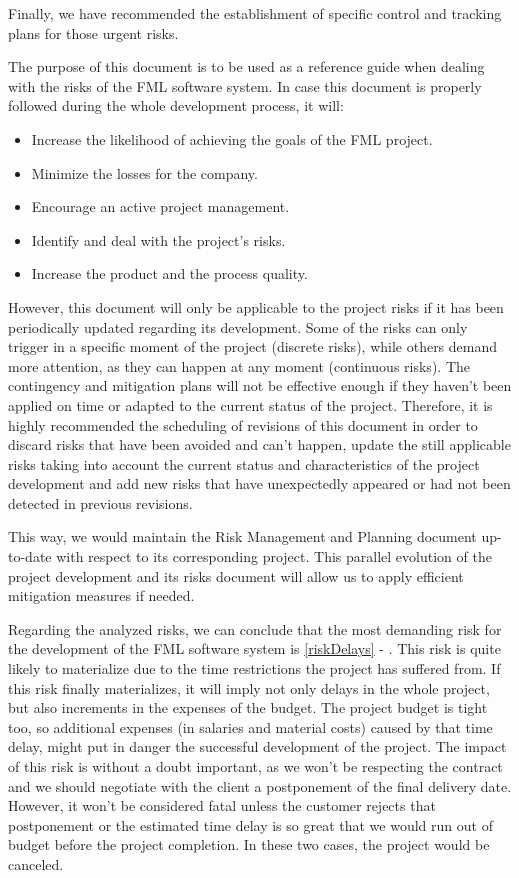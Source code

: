 \documentclass[11pt]{report}
\newcounter{risks}[subsection]
\newcommand{\rref}[1]{\ref{#1} - \nameref{#1}}
\begin{document}
Finally, we have recommended the establishment of specific control and tracking plans for those urgent risks.

The purpose of this document is to be used as a reference guide when dealing with the risks of the FML software system. In case this document is properly followed during the whole development process, it will:

\begin{itemize}
\item Increase the likelihood of achieving the goals of the FML project.
\item Minimize the losses for the company.
\item Encourage an active project management.
\item Identify and deal with the project's risks.
\item Increase the product and the process quality.
\end{itemize}

However, this document will only be applicable to the project risks if it has been periodically updated regarding its development. Some of the risks can only trigger in a specific moment of the project (discrete risks), while others demand more attention, as they can happen at any moment (continuous risks). The contingency and mitigation plans will not be effective enough if they haven't been applied on time or adapted to the current status of the project. Therefore, it is highly recommended the scheduling of revisions of this document in order to discard risks that have been avoided and can't happen, update the still applicable risks taking into account the current status and characteristics of the project development and add new risks that have unexpectedly appeared or had not been detected in previous revisions.

This way, we would maintain the Risk Management and Planning document up-to-date with respect to its corresponding project. This parallel evolution of the project development and its risks document will allow us to apply efficient mitigation measures if needed.

Regarding the analyzed risks, we can conclude that the most demanding risk for the development of the FML software system is \rref{riskDelays}. This risk is quite likely to materialize due to the time restrictions the project has suffered from. If this risk finally materializes, it will imply not only delays in the whole project, but also increments in the expenses of the budget. The project budget is tight too, so additional expenses (in salaries and material costs) caused by that time delay, might put in danger the successful development of the project. The impact of this risk is without a doubt important, as we won't be respecting the contract and we should negotiate with the client a postponement of the final delivery date. However, it won't be considered fatal unless the customer rejects that postponement or the estimated time delay is so great that we would run out of budget before the project completion. In these two cases, the project would be canceled.
\end{document}
